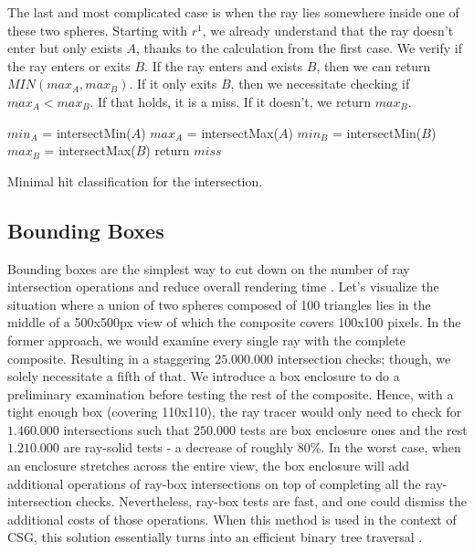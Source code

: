 \documentclass[a4paper,11pt,oneside]{article}
\begin{document}
The last and most complicated case is when the ray lies somewhere inside one of these two spheres. Starting with $r^1$, we already understand that the ray doesn't enter but only exists $A$, thanks to the calculation from the first case. We verify if the ray enters or exits $B$. If the ray enters and exists $B$, then we can return $MIN(max_{A}, max_{B})$. If it only exits $B$, then we necessitate checking if $max_A < max_B$. If that holds, it is a miss. If it doesn't, we return $max_B$.

\begin{algorithm}
	\SetAlgoLined
	$min_A$ = intersectMin($A$)\;
	$max_A$ = intersectMax($A$)\;
	$min_B$ = intersectMin($B$)\;
	$max_B$ = intersectMax($B$)\;
	return $miss$\;
	\caption{Minimal hit classification for the intersection.}
	\label{sec3.4:difference_algo}
\end{algorithm} 


\subsection{Bounding Boxes}
\label{section:bounding-boxes-optimization}

Bounding boxes are the simplest way to cut down on the number of ray intersection operations and reduce overall rendering time \cite{efficient_csg_meshes}. Let's visualize the situation where a union of two spheres composed of 100 triangles lies in the middle of a 500x500px view of which the composite covers 100x100 pixels. In the former approach, we would examine every single ray with the complete composite. Resulting in a staggering $25.000.000$ intersection checks; though,  we solely necessitate a fifth of that. We introduce a box enclosure to do a preliminary examination before testing the rest of the composite. Hence, with a tight enough box (covering 110x110), the ray tracer would only need to check for $1.460.000$ intersections such that $250.000$ tests are box enclosure ones and the rest $1.210.000$ are ray-solid tests - a decrease of roughly $80\%$. In the worst case, when an enclosure stretches across the entire view, the box enclosure will add additional operations of ray-box intersections on top of completing all the ray-intersection checks. Nevertheless, ray-box tests are fast, and one could dismiss the additional costs of those operations. When this method is used in the context of CSG, this solution essentially turns into an efficient binary tree traversal \cite{ROTH1982109}. 
\end{document}
